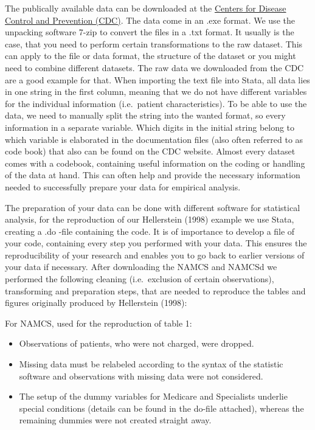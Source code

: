 \documentclass[
]{book}
\providecommand{\tightlist}{%
  \setlength{\itemsep}{0pt}\setlength{\parskip}{0pt}}
\begin{document}
The publically available data can be downloaded at the
\href{https://www.cdc.gov/nchs/ahcd}{Centers for Disease Control and
Prevention (CDC)}. The data come in an .exe format. We use the unpacking
software 7-zip to convert the files in a .txt format. It usually is the
case, that you need to perform certain transformations to the raw
dataset. This can apply to the file or data format, the structure of the
dataset or you might need to combine different datasets. The raw data we
downloaded from the CDC are a good example for that. When importing the
text file into Stata, all data lies in one string in the first column,
meaning that we do not have different variables for the individual
information (i.e.~patient characteristics). To be able to use the data,
we need to manually split the string into the wanted format, so every
information in a separate variable. Which digits in the initial string
belong to which variable is elaborated in the documentation files (also
often referred to as code book) that also can be found on the CDC
website. Almost every dataset comes with a codebook, containing useful
information on the coding or handling of the data at hand. This can
often help and provide the necessary information needed to successfully
prepare your data for empirical analysis.

The preparation of your data can be done with different software for
statistical analysis, for the reproduction of our Hellerstein (1998)
example we use Stata, creating a .do -file containing the code. It is of
importance to develop a file of your code, containing every step you
performed with your data. This ensures the reproducibility of your
research and enables you to go back to earlier versions of your data if
necessary. After downloading the NAMCS and NAMCSd we performed the
following cleaning (i.e.~exclusion of certain observations),
transforming and preparation steps, that are needed to reproduce the
tables and figures originally produced by Hellerstein (1998):

For NAMCS, used for the reproduction of table 1:

\begin{itemize}
\tightlist
\item
  Observations of patients, who were not charged, were dropped.
\item
  Missing data must be relabeled according to the syntax of the
  statistic software and observations with missing data were not
  considered.
\item
  The setup of the dummy variables for Medicare and Specialists underlie
  special conditions (details can be found in the do-file attached),
  whereas the remaining dummies were not created straight away.
\end{itemize}
\end{document}
